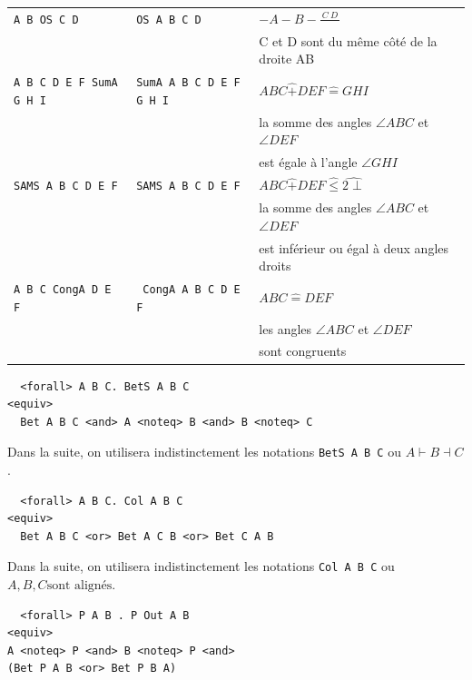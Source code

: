 \documentclass[8pt,a4paper]{article}
\theoremstyle{plain}
\begin{document}
\begin{tabular}{|l|l|l|}
  \verb+A B OS C D+ & \verb+OS A B C D+ & $-A - B - \frac{\ C \ D \ }{} $ \\
  &&C et D sont du même côté de la droite AB \\
    \hline

  \verb+A B C D E F SumA G H I+& \verb+SumA A B C D E F G H I+ & $A B C \widehat{+} D E F \widehat{=} G H I$ \\
  &&la somme des angles $\angle A B C$ et $\angle D E F$ \\
  && est égale à l'angle $\angle G H I$\\
  \hline
  
  \verb+SAMS A B C D E F+& \verb+SAMS A B C D E F+ & $A B C \widehat{+} D E F \widehat{\leq} \widehat{2\perp}$ \\
  &&la somme des angles $\angle A B C$ et $\angle D E F$ \\
  && est inférieur ou égal à deux angles droits\\
  \hline

    \verb+A B C CongA D E F+& \verb+ CongA A B C D E F+ & $A B C \widehat{=} D E F$ \\
  &&les angles $\angle A B C$ et $\angle D E F$ \\
  && sont congruents\\
  \hline

\end{tabular}

\begin{tcolorbox}
\begin{verbatim}
  <forall> A B C. BetS A B C 
<equiv>
  Bet A B C <and> A <noteq> B <and> B <noteq> C
\end{verbatim}
\end{tcolorbox}
Dans la suite, on utilisera indistinctement les notations \verb+BetS A B C+ ou $A \vdash B \dashv C$.

\begin{tcolorbox}
\begin{verbatim}
  <forall> A B C. Col A B C 
<equiv>
  Bet A B C <or> Bet A C B <or> Bet C A B
\end{verbatim}
\end{tcolorbox}
Dans la suite, on utilisera indistinctement les notations \verb+Col A B C+ ou $A,B,C \text{sont alignés}$.
\begin{tcolorbox}
\begin{verbatim}
  <forall> P A B . P Out A B 
<equiv>
A <noteq> P <and> B <noteq> P <and> 
(Bet P A B <or> Bet P B A)
\end{verbatim}
\end{tcolorbox}
\end{document}

